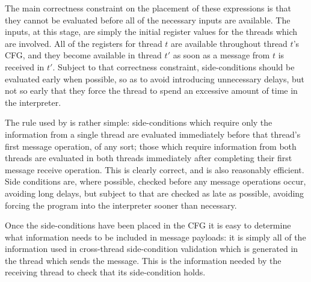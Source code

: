 



The main correctness constraint on the placement of these expressions
is that they cannot be evaluated before all of the necessary inputs
are available.  The inputs, at this stage, are simply the initial
register values for the threads which are involved.  All of the registers for thread $t$ are
available throughout thread $t$'s CFG, and they become available in
thread $t'$ as soon as a message from $t$ is received in $t'$.
Subject to that correctness constraint, side-conditions should be
evaluated early when possible, so as to avoid introducing unnecessary
delays, but not so early that they force the thread to spend an
excessive amount of time in the interpreter.

The rule used by {\technique} is rather simple: side-conditions which
require only the information from a single thread are evaluated
immediately before that thread's first message operation, of any sort;
those which require information from both threads are evaluated in
both threads immediately after completing their first message receive
operation.  This is clearly correct, and is also reasonably efficient.
Side conditions are, where possible, checked before any message
operations occur, avoiding long delays, but subject to that are
checked as late as possible, avoiding forcing the program into the
interpreter sooner than necessary.


Once the side-conditions have been placed in the CFG it is easy to
determine what information needs to be included in message payloads:
it is simply all of the information used in cross-thread
side-condition validation which is generated in the thread which sends
the message.  This is the information needed by the receiving thread
to check that its side-condition holds.

